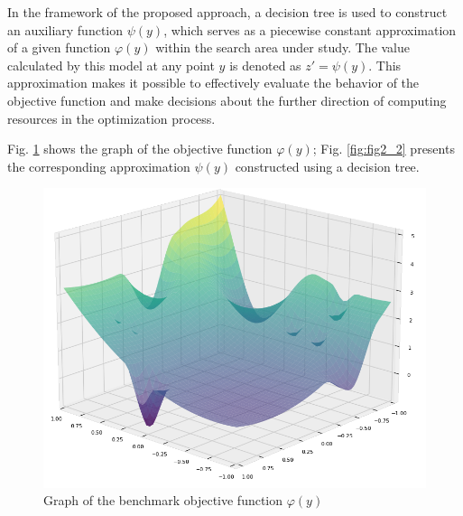 \documentclass[runningheads]{llncs}
\begin{document}
In the framework of the proposed approach, a decision tree is used to construct an auxiliary function $\psi(y)$, which serves as a piecewise constant approximation of a given function $\varphi(y)$ within the search area under study. The value calculated by this model at any point $y$ is denoted as $z' = \psi(y)$. This approximation makes it possible to effectively evaluate the behavior of the objective function and make decisions about the further direction of computing resources in the optimization process.





Fig. \ref{fig:fig2} shows the graph of the objective function $\varphi(y)$; Fig. \ref{fig:fig2_2} presents the corresponding approximation $\psi(y)$ constructed using a decision tree.
\begin{figure}
	\begin{center}
		\begin{minipage}[h]{0.7\linewidth}
			\includegraphics[width=1\linewidth]{figure/fig5.png}
			\caption{Graph of the benchmark objective function $\varphi(y)$} %
			\label{fig:fig2}
		\end{minipage}
	\end{center}
\end{figure}	
\end{document}
